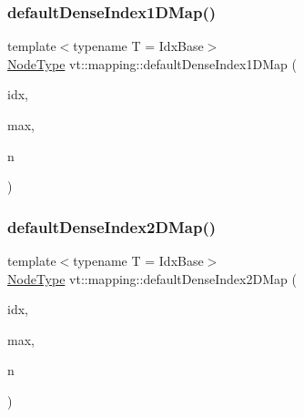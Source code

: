 \subsubsection{\texorpdfstring{default\+Dense\+Index1\+D\+Map()}{defaultDenseIndex1DMap()}}
{\footnotesize\ttfamily template$<$typename T  = Idx\+Base$>$ \\
\hyperlink{namespacevt_a866da9d0efc19c0a1ce79e9e492f47e2}{Node\+Type} vt\+::mapping\+::default\+Dense\+Index1\+D\+Map (\begin{DoxyParamCaption}\item[{\hyperlink{namespacevt_1_1mapping_a8b576cf2f31069778e4951f64bccafd8}{Idx1\+D\+Ptr}$<$ T $>$}]{idx,  }\item[{\hyperlink{namespacevt_1_1mapping_a8b576cf2f31069778e4951f64bccafd8}{Idx1\+D\+Ptr}$<$ T $>$}]{max,  }\item[{\hyperlink{namespacevt_a866da9d0efc19c0a1ce79e9e492f47e2}{Node\+Type}}]{n }\end{DoxyParamCaption})}

\mbox{\label{namespacevt_1_1mapping_a011c4e2cb832d3edcd98e3803d405ad4}} 
\subsubsection{\texorpdfstring{default\+Dense\+Index2\+D\+Map()}{defaultDenseIndex2DMap()}}
{\footnotesize\ttfamily template$<$typename T  = Idx\+Base$>$ \\
\hyperlink{namespacevt_a866da9d0efc19c0a1ce79e9e492f47e2}{Node\+Type} vt\+::mapping\+::default\+Dense\+Index2\+D\+Map (\begin{DoxyParamCaption}\item[{\hyperlink{namespacevt_1_1mapping_a6832cbb1361fe72fd7ec730e7b7773b3}{Idx2\+D\+Ptr}$<$ T $>$}]{idx,  }\item[{\hyperlink{namespacevt_1_1mapping_a6832cbb1361fe72fd7ec730e7b7773b3}{Idx2\+D\+Ptr}$<$ T $>$}]{max,  }\item[{\hyperlink{namespacevt_a866da9d0efc19c0a1ce79e9e492f47e2}{Node\+Type}}]{n }\end{DoxyParamCaption})}

\mbox{\label{namespacevt_1_1mapping_a776a69138a1fbceab5bbf10b9c07a858}} 
